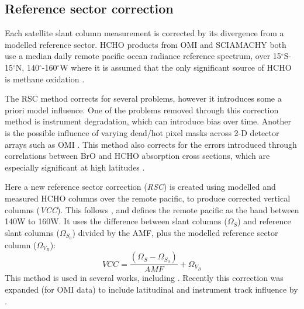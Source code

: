   \subsection{Reference sector correction}
    \label{Model:omiRecalc:RSC}
    Each satellite slant column measurement is corrected by its divergence from a modelled reference sector.
    HCHO products from OMI and SCIAMACHY both use a median daily remote pacific ocean radiance reference spectrum, over 15$^{\circ}$S-15$^{\circ}$N, 140$^{\circ}$-160$^{\circ}$W where it is assumed that the only significant source of HCHO is methane oxidation \parencite{DeSmedt2008,Barkley2013,Kurosu2014}.
    
    The RSC method corrects for several problems, however it introduces some a priori model influence.
    One of the problems removed through this correction method is instrument degradation, which can introduce bias over time.
    Another is the possible influence of varying dead/hot pixel masks across 2-D detector arrays such as OMI \parencite{DeSmedt2015}.
    This method also corrects for the errors introduced through correlations between BrO and HCHO absorption cross sections, which are especially significant at high latitudes \parencite{Abad2015}.
    
    Here a new reference sector correction (\textit{RSC}) is created using modelled and measured HCHO columns over the remote pacific, to produce corrected vertical columns (\textit{VCC}).
    This follows \textcite{Abad2016}, and defines the remote pacific as the band between 140{\degr}W to 160{\degr}W.
    It uses the difference between slant columns ($\Omega_S$) and reference slant columns ($\Omega_{S_0}$) divided by the AMF, plus the modelled reference sector column ($\Omega_{V_B}$):
    \begin{equation*}
      VCC = \frac{ \left( \Omega_S - \Omega_{S_0} \right) }{ AMF } + \Omega_{V_B}
    \end{equation*}
    This method is used in several works, including \textcite[eg.][]{DeSmedt2008, DeSmedt2012, DeSmedt2015, Barkley2013, Bauwens2016}.
    Recently this correction was expanded (for OMI data) to include latitudinal and instrument track influence by \textcite{Abad2015}.
    
